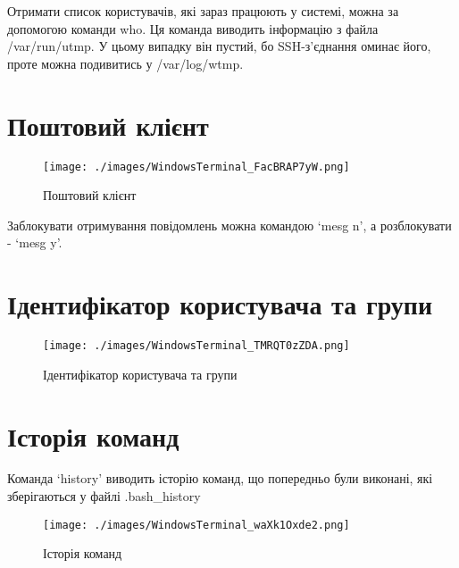Отримати список користувачів, які зараз працюють у системі, можна за допомогою команди who.
Ця команда виводить інформацію з файла /var/run/utmp.
У цьому випадку він пустий, бо SSH-з'єднання оминає його,
проте можна подивитись у /var/log/wtmp.

\section{Поштовий клієнт}
\label{sec:mail}

\begin{figure}[!ht]
    \centering
    \texttt{[image: ./images/WindowsTerminal\_FacBRAP7yW.png]}
    \caption{Поштовий клієнт}
    \label{fig:mail}
\end{figure}

Заблокувати отримування повідомлень можна командою `mesg n',
а розблокувати - `mesg y'.

\section{Ідентифікатор користувача та групи}
\label{sec:id}

\begin{figure}[!ht]
    \centering
    \texttt{[image: ./images/WindowsTerminal\_TMRQT0zZDA.png]}
    \caption{Ідентифікатор користувача та групи}
    \label{fig:id}
\end{figure}

\section{Історія команд}
\label{sec:history}

Команда `history' виводить історію команд,
що попередньо були виконані,
які зберігаються у файлі .bash\_history

\begin{figure}[!ht]
    \centering
    \texttt{[image: ./images/WindowsTerminal\_waXk1Oxde2.png]}
    \caption{Історія команд}
    \label{fig:history}
\end{figure}
